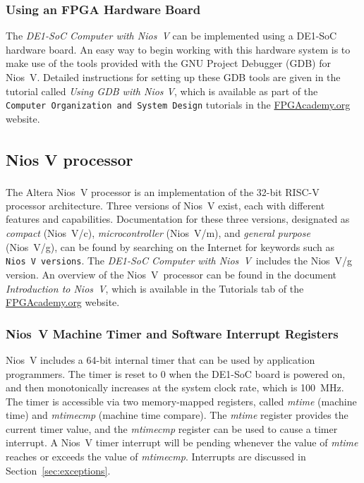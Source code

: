 \documentclass[11pt, twoside, pdftex]{article}
\newcommand{\DEBoard}{DE1-SoC}
\newcommand{\systemNameFull}{DE1-SoC Computer with Nios~V}
\newcommand{\processor}{Nios~V}
\begin{document}
\subsubsection {Using an FPGA Hardware Board}

The {\it \systemNameFull} can be implemented using a {\DEBoard} hardware
board.  An easy way to begin working with this hardware system is to make use of the tools
provided with the GNU Project Debugger (GDB) for Nios~V. Detailed instructions for setting up 
these GDB tools are given in the tutorial called {\it Using GDB with Nios V}, which is available
as part of the \texttt{Computer Organization and System Design} tutorials in the 
{\small \href{https://www.fpgacademy.org/tutorials.html} {FPGAcademy.org}} website.

\subsection{Nios\textsuperscript{\textregistered} V processor}
\label{sec:niosV}
The Altera Nios\textsuperscript{\textregistered}~V processor 
is an implementation of the 32-bit RISC-V processor architecture. Three versions of 
Nios~V exist, each with different features and capabilities.  Documentation for these 
three versions, designated as {\it compact} (Nios~V/c), {\it microcontroller} (Nios~V/m),
and {\it general purpose} (Nios~V/g), can be found by searching on the Internet for keywords 
such as \texttt{Nios~V versions}. The {\it \systemNameFull}~includes 
the Nios~V/g version. An overview of the \processor~processor can be found in the 
document {\it Introduction to \processor}, which is available in the 
Tutorials tab of the 
{\small \href{https://www.fpgacademy.org/tutorials.html} {FPGAcademy.org}} website.

\subsubsection{Nios~V Machine Timer and Software Interrupt Registers}
\label{sec:mtimer}
Nios~V includes a 64-bit internal timer that can be used by application programmers. 
The timer is reset to 0 when the {\DEBoard} board is powered on, and then monotonically
increases at the system clock rate, which is 100~MHz. The timer is accessible via two 
memory-mapped registers, 
called {\it mtime} (machine time) and {\it mtimecmp} (machine time compare). The 
{\it mtime} register provides the current timer value, and the {\it mtimecmp} register 
can be used to cause a timer interrupt. A Nios~V timer interrupt will be pending whenever 
the value of {\it mtime} reaches or exceeds the value of {\it mtimecmp}. Interrupts are 
discussed in Section~\ref{sec:exceptions}.
\end{document}
